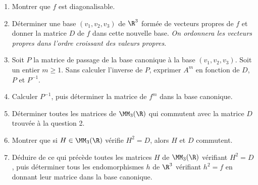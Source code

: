 \documentclass[twoside,french,11pt]{VcCours}
\begin{document}
\begin{enumerate}
\item Montrer que $f$ est diagonalisable.
\item Déterminer une base $(v_1,v_2,v_3)$ de $\R^3$ formée de vecteurs propres de $f$ et donner la matrice $D$ de $f$ dans cette nouvelle base. \textit{On ordonnera les vecteurs propres dans l'ordre croissant des valeurs propres}.
\item Soit $P$ la matrice de passage de la base canonique à la base $(v_1,v_2,v_3)$. Soit un entier $m \ge 1$. Sans calculer l'inverse de $P$, exprimer $A^m$ en fonction de $D$, $P$ et $P^{-1}$.
\item Calculer $P^{-1}$, puis déterminer la matrice de $f^m$ dans la base canonique.
\item Déterminer toutes les matrices de $\MM_3(\R)$ qui commutent avec la matrice $D$ trouvée à la question 2.
\item Montrer que si $H \in \MM_3(\R)$ vérifie $H^2=D$, alors $H$ et $D$ commutent.
\item Déduire de ce qui précède toutes les matrices $H$ de $\MM_3(\R)$ vérifiant $H^2=D$, puis déterminer tous les endomorphismes $h$ de $\R^3$ vérifiant $h^2=f$ en donnant leur matrice dans la base canonique.
\end{enumerate}



\bigskip
\end{document}
